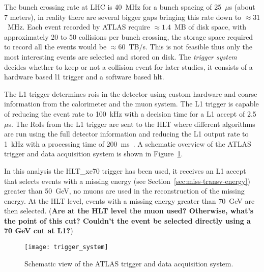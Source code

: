 The bunch crossing rate at LHC is 40~MHz for a bunch spacing of 25~$\mu$s (about
7 meters), in reality there are several bigger gaps bringing this rate down to
$\approx 31$~MHz. Each event recorded by ATLAS require $\approx 1.4$~MB of disk
space, with approximately 20 to 50 collisions per bunch crossing, the storage
space required to record all the events would be $\approx 60$~TB/s. This is not
feasible thus only the most interesting events are selected and stored on
disk. The \emph{trigger system} decides whether to keep or not a collision event
for later studies, it consists of a hardware based \gls{l1} trigger and a
software based \gls{hlt}.

The L1 trigger determines \gls{rois} in the detector using custom hardware and
coarse information from the calorimeter and the muon system. The L1 trigger is
capable of reducing the event rate to 100~kHz with a decision time for a L1
accept of 2.5~$\mu$s. The RoIs from the L1 trigger are sent to the HLT where
different algorithms are run using the full detector information and reducing
the L1 output rate to 1~kHz with a processing time of 200~ms~\cite{trigger}. A
schematic overview of the ATLAS trigger and data acquisition system is shown in
Figure~\ref{fig:trigger_system}.

In this analysis the HLT\_xe70 trigger has been used, it receives an L1 accept
that selects events with a missing energy (see
Section~\ref{sec:miss-transv-energy}) greater than 50~GeV, no muons are used in
the reconstruction of the missing energy. At the HLT level, events with a
missing energy greater than 70~GeV are then selected. (\textbf{Are at the HLT
  level the muon used? Otherwise, what's the point of this cut? Couldn't the
  event be selected directly using a 70 GeV cut at L1?})

\begin{figure}[!h]
  \centering
    \texttt{[image: trigger\_system]}
    \caption{Schematic view of the ATLAS trigger and data acquisition system.}
    \label{fig:trigger_system}
\end{figure}
